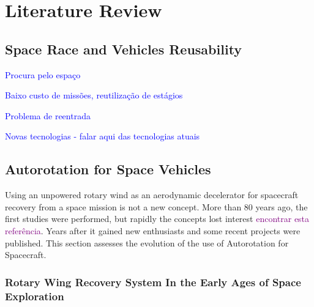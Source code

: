 
\chapter{Literature Review}
\label{chapter:literaturereview}


\section{Space Race and Vehicles Reusability}
\label{section:spacerace_reusability}

\textcolor{blue}{Procura pelo espaço}

\textcolor{blue}{Baixo custo de missões, reutilização de estágios}

\textcolor{blue}{Problema de reentrada}

\textcolor{blue}{Novas tecnologias - falar aqui das tecnologias atuais}

\section{Autorotation for Space Vehicles}
\label{section:autorotation_vehicles}

Using an unpowered rotary wind as an aerodynamic decelerator for spacecraft recovery from a space mission is not a new concept. More than 80 years ago, the first studies were performed, but rapidly the concepts lost interest \textcolor{purple}{encontrar esta referência}. Years after it gained new enthusiasts and some recent projects were published. This section assesses the evolution of the use of Autorotation for Spacecraft.

\subsection{Rotary Wing Recovery System In the Early Ages of Space Exploration}

